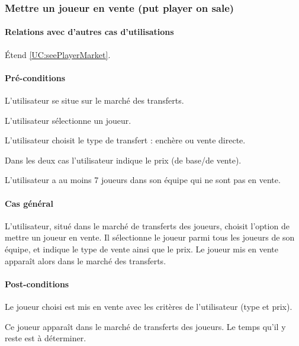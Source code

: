 \subsubsection{Mettre un joueur en vente (put player on sale)}
\label{UC:putPlayerOnSale}
\paragraph{Relations avec d'autres cas d'utilisations}
Étend \ref{UC:seePlayerMarket}.
\paragraph{Pré-conditions}
\begin{list}{}{\leftmargin=1.5em}
\item{L'utilisateur se situe sur le marché des transferts.}
\item{L'utilisateur sélectionne un joueur.}
\item{L'utilisateur choisit le type de transfert : enchère ou vente directe.}
\item{Dans les deux cas l'utilisateur indique le prix (de base/de vente).}
\item{L'utilisateur a au moins 7 joueurs dans son équipe qui ne sont pas en vente.}
\end{list}
\paragraph{Cas général}
L'utilisateur, situé dans le marché de transferts des joueurs, choisit l'option de mettre un joueur en vente. Il sélectionne le joueur parmi tous les joueurs de son équipe, et indique le type de vente ainsi que le prix. Le joueur mis en vente apparaît alors dans le marché des transferts.
\paragraph{Post-conditions}
\begin{list}{}{\leftmargin=1.5em}
\item{Le joueur choisi est mis en vente avec les critères de l'utilisateur (type et prix).}
\item{Ce joueur apparaît dans le marché de transferts des joueurs. Le temps qu'il y reste est à déterminer.}
\end{list}

